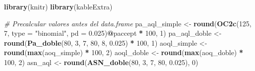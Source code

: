 \documentclass[
  12pt,
]{article}
\newenvironment{Shaded}{\begin{snugshade}}{\end{snugshade}}
\newcommand{\AttributeTok}[1]{\textcolor[rgb]{0.13,0.29,0.53}{#1}}
\newcommand{\CommentTok}[1]{\textcolor[rgb]{0.56,0.35,0.01}{\textit{#1}}}
\newcommand{\DecValTok}[1]{\textcolor[rgb]{0.00,0.00,0.81}{#1}}
\newcommand{\FloatTok}[1]{\textcolor[rgb]{0.00,0.00,0.81}{#1}}
\newcommand{\FunctionTok}[1]{\textcolor[rgb]{0.13,0.29,0.53}{\textbf{#1}}}
\newcommand{\NormalTok}[1]{#1}
\newcommand{\OtherTok}[1]{\textcolor[rgb]{0.56,0.35,0.01}{#1}}
\newcommand{\SpecialCharTok}[1]{\textcolor[rgb]{0.81,0.36,0.00}{\textbf{#1}}}
\newcommand{\StringTok}[1]{\textcolor[rgb]{0.31,0.60,0.02}{#1}}
\begin{document}
\begin{Shaded}
\begin{Highlighting}[]
\FunctionTok{library}\NormalTok{(knitr)}
\FunctionTok{library}\NormalTok{(kableExtra)}

\CommentTok{\# Precalcular valores antes del data.frame}
\NormalTok{pa\_aql\_simple }\OtherTok{\textless{}{-}} \FunctionTok{round}\NormalTok{(}\FunctionTok{OC2c}\NormalTok{(}\DecValTok{125}\NormalTok{, }\DecValTok{7}\NormalTok{, }\AttributeTok{type =} \StringTok{"binomial"}\NormalTok{, }
                             \AttributeTok{pd =} \FloatTok{0.025}\NormalTok{)}\SpecialCharTok{@}\NormalTok{paccept }\SpecialCharTok{*} \DecValTok{100}\NormalTok{, }\DecValTok{1}\NormalTok{)}
\NormalTok{pa\_aql\_doble  }\OtherTok{\textless{}{-}} \FunctionTok{round}\NormalTok{(}\FunctionTok{Pa\_doble}\NormalTok{(}\DecValTok{80}\NormalTok{, }\DecValTok{3}\NormalTok{, }\DecValTok{7}\NormalTok{, }\DecValTok{80}\NormalTok{, }\DecValTok{8}\NormalTok{, }\FloatTok{0.025}\NormalTok{) }\SpecialCharTok{*} \DecValTok{100}\NormalTok{, }\DecValTok{1}\NormalTok{)}
\NormalTok{aoql\_simple   }\OtherTok{\textless{}{-}} \FunctionTok{round}\NormalTok{(}\FunctionTok{max}\NormalTok{(aoq\_simple) }\SpecialCharTok{*} \DecValTok{100}\NormalTok{, }\DecValTok{2}\NormalTok{)}
\NormalTok{aoql\_doble    }\OtherTok{\textless{}{-}} \FunctionTok{round}\NormalTok{(}\FunctionTok{max}\NormalTok{(aoq\_doble) }\SpecialCharTok{*} \DecValTok{100}\NormalTok{, }\DecValTok{2}\NormalTok{)}
\NormalTok{asn\_aql       }\OtherTok{\textless{}{-}} \FunctionTok{round}\NormalTok{(}\FunctionTok{ASN\_doble}\NormalTok{(}\DecValTok{80}\NormalTok{, }\DecValTok{3}\NormalTok{, }\DecValTok{7}\NormalTok{, }\DecValTok{80}\NormalTok{, }\FloatTok{0.025}\NormalTok{), }\DecValTok{0}\NormalTok{)}


\end{Highlighting}
\end{Shaded}
\end{document}
